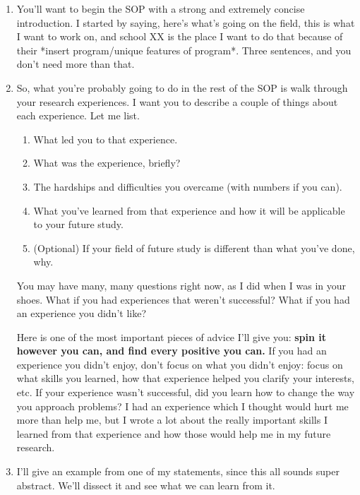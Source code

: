 \documentclass[12pt]{article}
\begin{document}
\begin{enumerate}
	\item You'll want to begin the SOP with a strong and extremely concise introduction. I started by saying, here's what's going on the field, this is what I want to work on, and school XX is the place I want to do that because of their *insert program/unique features of program*. Three sentences, and you don't need more than that. 

	\item So, what you're probably going to do in the rest of the SOP is walk through your research experiences. I want you to describe a couple of things about each experience. Let me list.

	\begin{enumerate}
	\item What led you to that experience.
	\item What was the experience, briefly?
	\item The hardships and difficulties you overcame (with numbers if you can).
	\item What you've learned from that experience and how it will be applicable to your future study.
	\item (Optional) If your field of future study is different than what you've done, why.
	\end{enumerate}
	
	You may have many, many questions right now, as I did when I was in your shoes. What if you had experiences that weren't successful? What if you had an experience you didn't like?

	Here is one of the most important pieces of advice I'll give you: \textbf{spin it however you can, and find every positive you can.} If you had an experience you didn't enjoy, don't focus on what you didn't enjoy: focus on what skills you learned, how that experience helped you clarify your interests, etc. If your experience wasn't successful, did you learn how to change the way you approach problems? I had an experience which I thought would hurt me more than help me, but I wrote a lot about the really important skills I learned from that experience and how those would help me in my future research.

	\item I'll give an example from one of my statements, since this all sounds super abstract. We'll dissect it and see what we can learn from it.


\end{enumerate}
\end{document}
